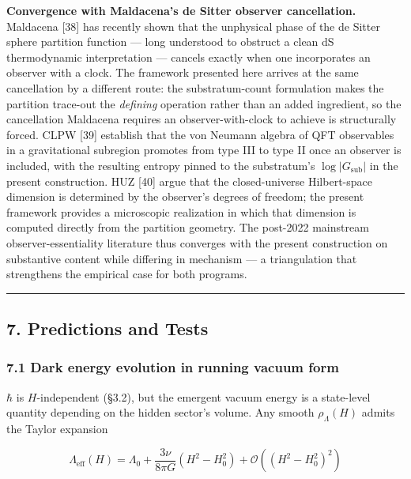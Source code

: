 \documentclass[
]{article}
\begin{document}
\textbf{Convergence with Maldacena's de Sitter observer cancellation.}
Maldacena {[}38{]} has recently shown that the unphysical phase of the
de Sitter sphere partition function --- long understood to obstruct a
clean dS thermodynamic interpretation --- cancels exactly when one
incorporates an observer with a clock. The framework presented here
arrives at the same cancellation by a different route: the
substratum-count formulation makes the partition trace-out the
\emph{defining} operation rather than an added ingredient, so the
cancellation Maldacena requires an observer-with-clock to achieve is
structurally forced. CLPW {[}39{]} establish that the von Neumann
algebra of QFT observables in a gravitational subregion promotes from
type III to type II once an observer is included, with the resulting
entropy pinned to the substratum's \(\log|G_{\text{sub}}|\) in the
present construction. HUZ {[}40{]} argue that the closed-universe
Hilbert-space dimension is determined by the observer's degrees of
freedom; the present framework provides a microscopic realization in
which that dimension is computed directly from the partition geometry.
The post-2022 mainstream observer-essentiality literature thus converges
with the present construction on substantive content while differing in
mechanism --- a triangulation that strengthens the empirical case for
both programs.

\begin{center}\rule{0.5\linewidth}{0.5pt}\end{center}

\hypertarget{predictions-and-tests}{%
\subsection{7. Predictions and Tests}\label{predictions-and-tests}}

\hypertarget{dark-energy-evolution-in-running-vacuum-form}{%
\subsubsection{7.1 Dark energy evolution in running vacuum
form}\label{dark-energy-evolution-in-running-vacuum-form}}

\(\hbar\) is \(H\)-independent (§3.2), but the emergent vacuum energy is
a state-level quantity depending on the hidden sector's volume. Any
smooth \(\rho_\Lambda(H)\) admits the Taylor expansion

\[\Lambda_{\text{eff}}(H) = \Lambda_0 + \frac{3\nu}{8\pi G}(H^2 - H_0^2) + \mathcal{O}((H^2 - H_0^2)^2)\]
\end{document}
